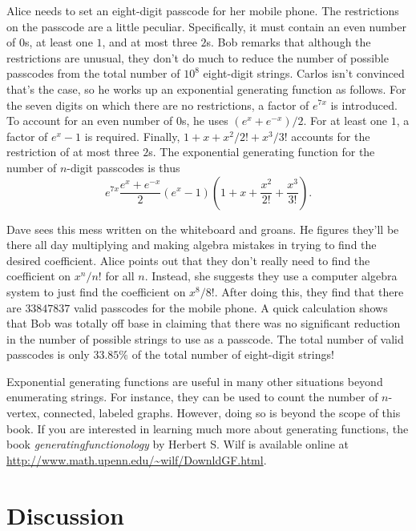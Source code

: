 \begin{example}
  Alice needs to set an eight-digit passcode for her mobile phone. The
  restrictions on the passcode are a little peculiar. Specifically, it
  must contain an even number of $0$s, at least one $1$, and at most
  three $2$s. Bob remarks that although the restrictions are unusual,
  they don't do much to reduce the number of possible passcodes from
  the total number of $10^8$ eight-digit strings. Carlos isn't
  convinced that's the case, so he works up an exponential generating
  function as follows. For the seven digits on which there are no
  restrictions, a factor of $e^{7x}$ is introduced. To account for an
  even number of $0$s, he uses $(e^x+e^{-x})/2$. For at least one
  $1$, a factor of $e^x-1$ is required. Finally, $1+x+x^2/2!+x^3/3!$
  accounts for the restriction of at most three $2$s. The exponential
  generating function for the number of $n$-digit passcodes is thus
  \[e^{7x}\frac{e^x+e^{-x}}{2}(e^x-1)\left(1+x+\frac{x^2}{2!} +
    \frac{x^3}{3!}\right).\]
  
  Dave sees this mess written on the whiteboard and groans. He figures
  they'll be there all day multiplying and making algebra mistakes in
  trying to find the desired coefficient. Alice points out that they
  don't really need to find the coefficient on $x^n/n!$ for all
  $n$. Instead, she suggests they use a computer algebra system to
  just find the coefficient on $x^8/8!$. After doing this, they find
  that there are $33847837$ valid passcodes for the mobile phone. A
  quick calculation shows that Bob was totally off base in claiming
  that there was no significant reduction in the number of possible
  strings to use as a passcode. The total number of valid passcodes is
  only $33.85\%$ of the total number of eight-digit strings!
\end{example}

Exponential generating functions are useful in many other situations
beyond enumerating strings. For instance, they can be used to count
the number of $n$-vertex, connected, labeled graphs. However, doing so
is beyond the scope of this book. If you are interested in learning
much more about generating functions, the book
\emph{generatingfunctionology} by Herbert S. Wilf is available online
at \url{http://www.math.upenn.edu/~wilf/DownldGF.html}.

\section{Discussion}

